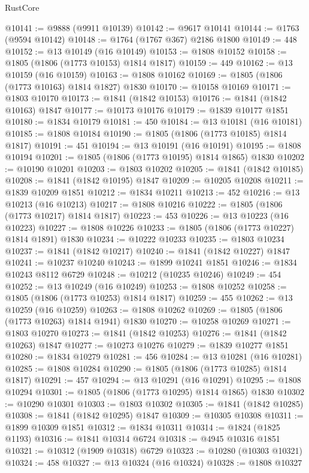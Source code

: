 \begin{lexlean}{RustCore}
\begin{coremodule}
@10141 := @9888 (@9911 @10139)
@10142 := @9617 @10141
@10144 := @1763 (@9594 @10142)
@10148 := @1764 (@1767 @367) @2186 @1800
@10149 := 448
@10152 := @13 @10149 (@16 @10149)
@10153 := @1808 @10152
@10158 := @1805 (@1806 (@1773 @10153) @1814 @1817)
@10159 := 449
@10162 := @13 @10159 (@16 @10159)
@10163 := @1808 @10162
@10169 := @1805 (@1806 (@1773 @10163) @1814 @1827) @1830
@10170 := @10158 @10169
@10171 := @1803 @10170
@10173 := @1841 (@1842 @10153)
@10176 := @1841 (@1842 @10163) @1847
@10177 := @10173 @10176
@10179 := @1839 @10177 @1851
@10180 := @1834 @10179
@10181 := 450
@10184 := @13 @10181 (@16 @10181)
@10185 := @1808 @10184
@10190 := @1805 (@1806 (@1773 @10185) @1814 @1817)
@10191 := 451
@10194 := @13 @10191 (@16 @10191)
@10195 := @1808 @10194
@10201 := @1805 (@1806 (@1773 @10195) @1814 @1865) @1830
@10202 := @10190 @10201
@10203 := @1803 @10202
@10205 := @1841 (@1842 @10185)
@10208 := @1841 (@1842 @10195) @1847
@10209 := @10205 @10208
@10211 := @1839 @10209 @1851
@10212 := @1834 @10211
@10213 := 452
@10216 := @13 @10213 (@16 @10213)
@10217 := @1808 @10216
@10222 := @1805 (@1806 (@1773 @10217) @1814 @1817)
@10223 := 453
@10226 := @13 @10223 (@16 @10223)
@10227 := @1808 @10226
@10233 := @1805 (@1806 (@1773 @10227) @1814 @1891) @1830
@10234 := @10222 @10233
@10235 := @1803 @10234
@10237 := @1841 (@1842 @10217)
@10240 := @1841 (@1842 @10227) @1847
@10241 := @10237 @10240
@10243 := @1899 @10241 @1851
@10246 := @1834 @10243 @8112 @6729
@10248 := @10212 (@10235 @10246)
@10249 := 454
@10252 := @13 @10249 (@16 @10249)
@10253 := @1808 @10252
@10258 := @1805 (@1806 (@1773 @10253) @1814 @1817)
@10259 := 455
@10262 := @13 @10259 (@16 @10259)
@10263 := @1808 @10262
@10269 := @1805 (@1806 (@1773 @10263) @1814 @1941) @1830
@10270 := @10258 @10269
@10271 := @1803 @10270
@10273 := @1841 (@1842 @10253)
@10276 := @1841 (@1842 @10263) @1847
@10277 := @10273 @10276
@10279 := @1839 @10277 @1851
@10280 := @1834 @10279
@10281 := 456
@10284 := @13 @10281 (@16 @10281)
@10285 := @1808 @10284
@10290 := @1805 (@1806 (@1773 @10285) @1814 @1817)
@10291 := 457
@10294 := @13 @10291 (@16 @10291)
@10295 := @1808 @10294
@10301 := @1805 (@1806 (@1773 @10295) @1814 @1865) @1830
@10302 := @10290 @10301
@10303 := @1803 @10302
@10305 := @1841 (@1842 @10285)
@10308 := @1841 (@1842 @10295) @1847
@10309 := @10305 @10308
@10311 := @1899 @10309 @1851
@10312 := @1834 @10311
@10314 := @1824 (@1825 @1193)
@10316 := @1841 @10314 @6724
@10318 := @4945 @10316 @1851
@10321 := @10312 (@1909 @10318) @6729
@10323 := @10280 (@10303 @10321)
@10324 := 458
@10327 := @13 @10324 (@16 @10324)
@10328 := @1808 @10327

\end{coremodule}
\end{lexlean}
